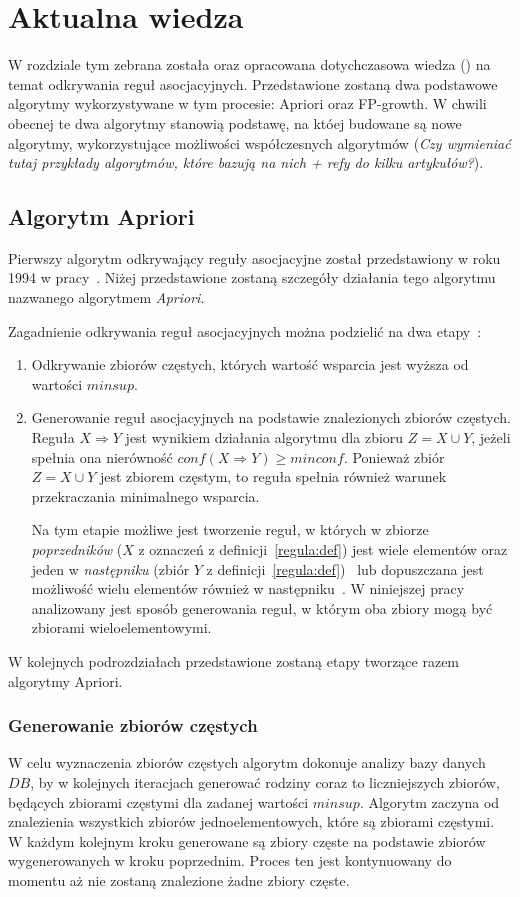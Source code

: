 \section{Aktualna wiedza}
W rozdziale tym zebrana została oraz opracowana dotychczasowa wiedza () na temat odkrywania reguł asocjacyjnych. Przedstawione zostaną dwa podstawowe algorytmy wykorzystywane w tym procesie: Apriori oraz FP-growth. W chwili obecnej te dwa algorytmy stanowią podstawę, na któej budowane są nowe algorytmy, wykorzystujące możliwości współczesnych algorytmów (\emph{Czy wymieniać tutaj przykłady algorytmów, które bazują na nich + refy do kilku artykułów?}).

\subsection{Algorytm Apriori}\label{apriori:section}
Pierwszy algorytm odkrywający reguły asocjacyjne został przedstawiony w roku 1994 w pracy~\cite{Apriori:Main}. Niżej przedstawione zostaną szczegóły działania tego algorytmu nazwanego algorytmem \emph{Apriori}.

Zagadnienie odkrywania reguł asocjacyjnych można podzielić na dwa etapy~\cite{Problem:Statement}:
\begin{enumerate}
	\item Odkrywanie zbiorów częstych, których wartość wsparcia jest wyższa od wartości $minsup$.
	\item Generowanie reguł asocjacyjnych na podstawie znalezionych zbiorów częstych. Reguła $X \Rightarrow Y$ jest wynikiem działania algorytmu dla zbioru $Z = X \cup Y$, jeżeli spełnia ona nierówność $conf(X \Rightarrow Y) \geq minconf$. Ponieważ zbiór $Z = X \cup Y$ jest zbiorem częstym, to reguła spełnia również warunek przekraczania minimalnego wsparcia.

	Na tym etapie możliwe jest tworzenie reguł, w których w zbiorze \emph{poprzedników} ($X$ z oznaczeń z definicji~\ref{regula:def}) jest wiele elementów oraz jeden w \emph{następniku} (zbiór $Y$ z definicji~\ref{regula:def})~\cite{Problem:Statement} lub dopuszczana jest możliwość wielu elementów również w następniku~\cite{Apriori:Main}. W niniejszej pracy analizowany jest sposób generowania reguł, w którym oba zbiory mogą być zbiorami wieloelementowymi.
\end{enumerate}

W kolejnych podrozdziałach przedstawione zostaną etapy tworzące razem algorytmy Apriori.

\subsubsection{Generowanie zbiorów częstych}\label{apriori:gen}
W celu wyznaczenia zbiorów częstych algorytm dokonuje analizy bazy danych $DB$, by w kolejnych iteracjach generować rodziny coraz to liczniejszych zbiorów, będących zbiorami częstymi dla zadanej wartości $minsup$. Algorytm zaczyna od znalezienia wszystkich zbiorów jednoelementowych, które są zbiorami częstymi. W każdym kolejnym kroku generowane są zbiory częste na podstawie zbiorów wygenerowanych w kroku poprzednim. Proces ten jest kontynuowany do momentu aż nie zostaną znalezione żadne zbiory częste.

